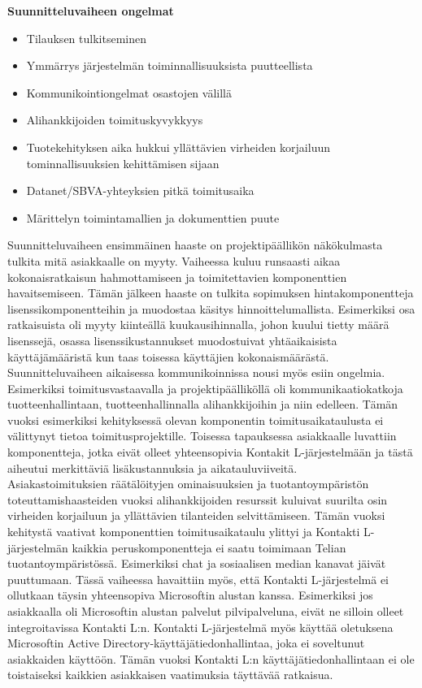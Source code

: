 \documentclass[finnish,12pt,a4paper,pdftex]{article}
\begin{document}
\textbf{Suunnitteluvaiheen ongelmat}\\
\begin{itemize}
    \item Tilauksen tulkitseminen
    \item Ymmärrys järjestelmän toiminnallisuuksista puutteellista
    \item Kommunikointiongelmat osastojen välillä
    \item Alihankkijoiden toimituskyvykkyys
    \item Tuotekehityksen aika hukkui yllättävien virheiden korjailuun tominnallisuuksien kehittämisen sijaan
    \item Datanet/SBVA-yhteyksien pitkä toimitusaika
    \item Märittelyn toimintamallien ja dokumenttien puute
\end{itemize}

Suunnitteluvaiheen ensimmäinen haaste on projektipäällikön näkökulmasta tulkita mitä asiakkaalle on myyty. Vaiheessa kuluu runsaasti aikaa kokonaisratkaisun hahmottamiseen ja toimitettavien komponenttien havaitsemiseen. Tämän jälkeen haaste on tulkita sopimuksen hintakomponentteja lisenssikomponentteihin ja muodostaa käsitys hinnoittelumallista. Esimerkiksi osa ratkaisuista oli myyty kiinteällä kuukausihinnalla, johon kuului tietty määrä lisenssejä, osassa  lisenssikustannukset muodostuivat yhtäaikaisista käyttäjämääristä kun taas toisessa käyttäjien kokonaismäärästä.\\

Suunnitteluvaiheen aikaisessa kommunikoinnissa nousi myös esiin ongelmia. Esimerkiksi toimitusvastaavalla ja projektipäälliköllä oli kommunikaatiokatkoja tuotteenhallintaan, tuotteenhallinnalla alihankkijoihin ja niin edelleen. Tämän vuoksi esimerkiksi kehityksessä olevan komponentin toimitusaikataulusta ei välittynyt tietoa toimitusprojektille. Toisessa tapauksessa asiakkaalle luvattiin komponentteja, jotka eivät olleet yhteensopivia Kontakit L-järjestelmään ja tästä aiheutui merkittäviä lisäkustannuksia ja aikatauluviiveitä.\\

Asiakastoimituksien räätälöityjen ominaisuuksien ja tuotantoympäristön toteuttamishaasteiden vuoksi alihankkijoiden resurssit kuluivat suurilta osin virheiden korjailuun ja yllättävien tilanteiden selvittämiseen. Tämän vuoksi kehitystä vaativat komponenttien toimitusaikataulu ylittyi ja Kontakti L-järjestelmän kaikkia peruskomponentteja ei saatu toimimaan Telian tuotantoympäristössä. Esimerkiksi chat ja sosiaalisen median kanavat jäivät puuttumaan. Tässä vaiheessa havaittiin myös, että Kontakti L-järjestelmä ei ollutkaan täysin yhteensopiva Microsoftin alustan kanssa. Esimerkiksi jos asiakkaalla oli Microsoftin alustan palvelut pilvipalveluna, eivät ne silloin olleet integroitavissa Kontakti L:n. Kontakti L-järjestelmä myös käyttää oletuksena Microsoftin Active Directory-käyttäjätiedonhallintaa, joka ei soveltunut asiakkaiden käyttöön. Tämän vuoksi Kontakti L:n käyttäjätiedonhallintaan ei ole toistaiseksi kaikkien asiakkaisen vaatimuksia täyttävää ratkaisua.\\
\end{document}
